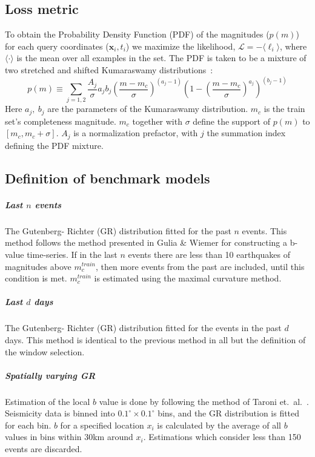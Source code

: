 \documentclass[pdflatex]{sn-jnl}
\begin{document}
\subsection{Loss metric}
To obtain the Probability Density Function (PDF) of the magnitudes ($p(m)$) for each query coordinates ($\textbf{x}_i, t_i$) we maximize the likelihood, $\mathcal{L} = -\langle \ell_i \rangle$, where $\langle \cdot\rangle$ is the mean over all examples in the set. The PDF is taken to be a mixture of two stretched and shifted Kumaraswamy distributions~\cite{kumaraswamy_generalized_1980}:
\begin{equation}
    p\left( m \right)
    \equiv
    \sum_{j=1,2} \frac{A_j}{\sigma}a_jb_j\left(\frac{m-m_c}{\sigma}\right)^{\left(a_j-1\right)}\left(1-\left(\frac{m-m_c}{\sigma}\right)^{a_j}\right)^{\left(b_j-1\right)}
\end{equation}
Here $a_j, \ b_j$ are the parameters of the Kumaraswamy distribution. $m_c$ is the train set's completeness magnitude. $m_c$ together with $\sigma$ define the support of $p(m)$ to $[m_c, m_c+\sigma]$. $A_j$ is a normalization prefactor, with $j$ the summation index defining the PDF mixture.

\subsection{Definition of benchmark models}
\subparagraph{Last $n$ events} The Gutenberg- Richter (GR) distribution fitted for the past $n$ events. This method follows the method presented in Gulia \& Wiemer\cite{gulia_real-time_2019} for constructing a b-value time-series. If in the last $n$ events there are less than 10 earthquakes of magnitudes above $m_c^{train}$, then more events from the past are included, until this condition is met. $m_c^{train}$ is estimated using the maximal curvature method\cite{wiemer_minimum_2000}.

\subparagraph{Last $d$ days} The Gutenberg- Richter (GR) distribution fitted for the events in the past $d$ days. This method is identical to the previous method in all but the definition of the window selection.

\subparagraph{Spatially varying GR} Estimation of the local $b$ value is done by following the method of Taroni et.~al.~\cite{taroni_highdefinition_2021}. Seismicity data is 
binned into $0.1^\circ \times 0.1^\circ$ bins, and the GR distribution is fitted for each bin. $b$ for a specified location $x_i$ is calculated by the average of all $b$ values in bins within 30km around $x_i$. Estimations which consider less than 150 events are discarded.
\end{document}
